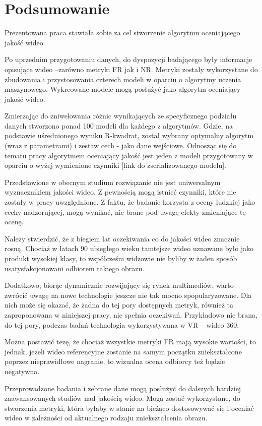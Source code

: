 \chapter{Podsumowanie}




Prezentowana praca stawiała sobie za cel stworzenie algorytmu oceniającego jakość wideo.

Po uprzednim przygotowaniu danych, do dyspozycji badającego były informacje opisujące wideo –zarówno metryki FR jak i NR. Metryki zostały wykorzystane do zbudowania i przystosowania czterech modeli w oparciu o algorytmy uczenia maszynowego. Wykreowane modele mogą posłużyć jako algorytm oceniający jakość wideo.

Zmierzając do zniwelowania różnic wynikających ze specyficznego podziału danych stworzono ponad 100 modeli dla każdego z algorytmów. Gdzie, na podstawie uśrednionego wyniku R-kwadrat, został wybrany optymalny algorytm (wraz z parametrami) i zestaw cech - jako dane wejściowe. Odnosząc się do tematu pracy algorytmem oceniający jakość jest jeden z modeli przygotowany w oparciu o wyżej wymienione czynniki [link do zserializowanego modelu].

Przedstawione w obecnym studium rozwiązanie nie jest uniwersalnym wyznacznikiem jakości wideo. Z pewnością mogą istnieć czynniki, które nie zostały w pracy uwzględnione. Z faktu, że badanie korzysta z oceny ludzkiej jako cechy nadzorującej, mogą wynikać, nie brane pod uwagę efekty zmieniające tę ocenę.

Należy stwierdzić, że z biegiem lat oczekiwania co do jakości wideo znacznie rosną. Chociaż w latach 90 ubiegłego wieku tamtejsze wideo uznawane było jako produkt wysokiej klasy, to współcześni widzowie nie byliby w żaden sposób usatysfakcjonowani odbiorem takiego obrazu. 

Dodatkowo, biorąc dynamicznie rozwijający się rynek multimediów, warto zwrócić uwagę na nowe technologie jeszcze nie tak mocno spopularyzowane. Dla nich może się okazać, że żadna do tej pory dostępnych metryk, również ta  zaproponowana w niniejszej pracy,  nie spełnia oczekiwań. Przykładowo nie brana, do tej pory, podczas badań technologia wykorzystywana w VR -- wideo 360.  

Można postawić tezę, że chociaż wszystkie metryki FR mają wysokie wartości, to jednak, jeżeli wideo referencyjne zostanie na samym początku zniekształcone poprzez nieprawidłowe nagranie, to wizualna ocena odbiorcy też będzie negatywna.

Przeprowadzone badania i zebrane dane mogą posłużyć do dalszych bardziej
zaawansowanych studiów nad jakością wideo. Mogą zostać wykorzystane, do stworzenia metryki, która byłaby w stanie na bieżąco dostosowywać się i oceniać wideo w zależności od aktualnego rodzaju zniekształcenia obrazu.


\label{cha:pierwszyDokument}









